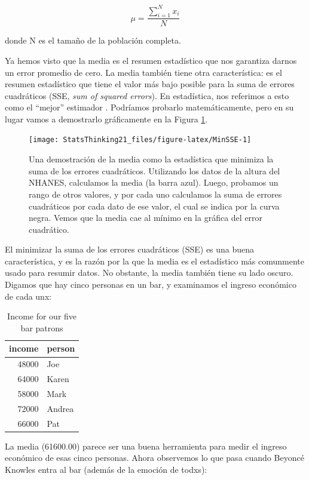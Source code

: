 \documentclass[
  12pt,
]{book}
\begin{document}
\[
\mu = \frac{\sum_{i=1}^{N}x_i}{N}
\]

donde N es el tamaño de la población completa.

Ya hemos visto que la media es el resumen estadístico que nos garantiza darnos un error promedio de cero. La media también tiene otra característica: es el resumen estadístico que tiene el valor más bajo posible para la suma de errores cuadráticos (SSE, \emph{sum of squared errors}). En estadística, nos referimos a esto como el ``mejor'' estimador . Podríamos probarlo matemáticamente, pero en su lugar vamos a demostrarlo gráficamente en la Figura \ref{fig:MinSSE}.

\begin{figure}
\texttt{[image: StatsThinking21\_files/figure-latex/MinSSE-1]} \caption{Una demostración de la media como la estadística que minimiza la suma de los errores cuadráticos. Utilizando los datos de la altura del NHANES, calculamos la media (la barra azul). Luego, probamos un rango de otros valores, y por cada uno calculamos la suma de errores cuadráticos por cada dato de ese valor, el cual se indica por la curva negra. Vemos que la media cae al mínimo en la gráfica del error cuadrático.}\label{fig:MinSSE}
\end{figure}

El minimizar la suma de los errores cuadráticos (SSE) es una buena característica, y es la razón por la que la media es el estadístico más comunmente usado para resumir datos. No obstante, la media también tiene su lado oscuro. Digamos que hay cinco personas en un bar, y examinamos el ingreso económico de cada unx:

\begin{table}

\caption{\label{tab:unnamed-chunk-17}Income for our five bar patrons}
\centering
\begin{tabular}[t]{r|l}
\hline
income & person\\
\hline
48000 & Joe\\
\hline
64000 & Karen\\
\hline
58000 & Mark\\
\hline
72000 & Andrea\\
\hline
66000 & Pat\\
\hline
\end{tabular}
\end{table}

La media (61600.00) parece ser una buena herramienta para medir el ingreso económico de esas cinco personas. Ahora observemos lo que pasa cuando Beyoncé Knowles entra al bar (además de la emoción de todxs):
\end{document}
